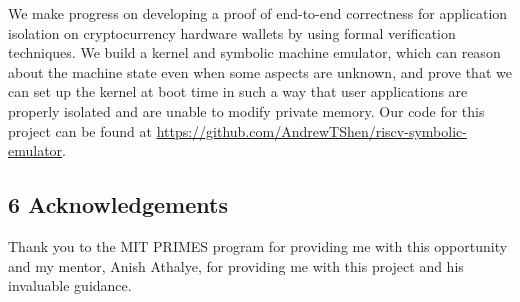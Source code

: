 \documentclass[]{article}
\begin{document}
We make progress on developing a proof of end-to-end correctness for
application isolation on cryptocurrency hardware wallets by using formal
verification techniques. We build a kernel and symbolic machine
emulator, which can reason about the machine state even when some
aspects are unknown, and prove that we can set up the kernel at boot
time in such a way that user applications are properly isolated and are
unable to modify private memory. Our code for this project can be found at \url{https://github.com/AndrewTShen/riscv-symbolic-emulator}.

\subsection{6 Acknowledgements}\label{acknowledgements}
Thank you to the MIT PRIMES program for providing me with this opportunity and my mentor, Anish Athalye, for providing me with this project and his invaluable guidance.

\nocite{*}


\end{document}
